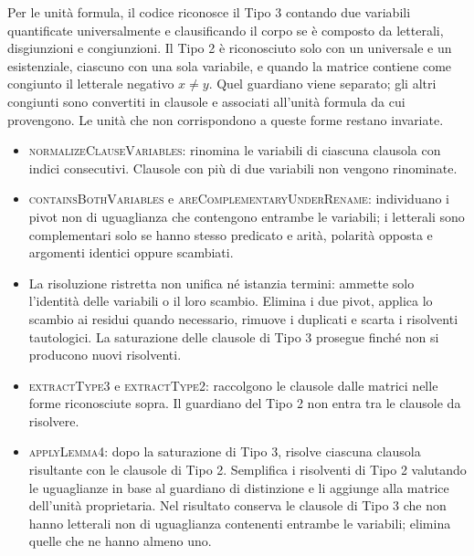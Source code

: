 Per le unità formula, il codice riconosce il Tipo 3 contando due variabili quantificate universalmente e clausificando il corpo se è composto da letterali, disgiunzioni e congiunzioni. Il Tipo 2 è riconosciuto solo con un universale e un esistenziale, ciascuno con una sola variabile, e quando la matrice contiene come congiunto il letterale negativo $x\ne y$. Quel guardiano viene separato; gli altri congiunti sono convertiti in clausole e associati all'unità formula da cui provengono. Le unità che non corrispondono a queste forme restano invariate.
\begin{itemize}
    \item \textsc{normalizeClauseVariables}: rinomina le variabili di ciascuna clausola con indici consecutivi. Clausole con più di due variabili non vengono rinominate.
    
    \item \textsc{containsBothVariables} e \textsc{areComplementaryUnderRename}: individuano i pivot non di uguaglianza che contengono entrambe le variabili; i letterali sono complementari solo se hanno stesso predicato e arità, polarità opposta e argomenti identici oppure scambiati.
    
    \item La risoluzione ristretta non unifica né istanzia termini: ammette solo l'identità delle variabili o il loro scambio. Elimina i due pivot, applica lo scambio ai residui quando necessario, rimuove i duplicati e scarta i risolventi tautologici. La saturazione delle clausole di Tipo 3 prosegue finché non si producono nuovi risolventi.
    
    \item \textsc{extractType3} e \textsc{extractType2}: raccolgono le clausole dalle matrici nelle forme riconosciute sopra. Il guardiano del Tipo 2 non entra tra le clausole da risolvere.
    
    \item \textsc{applyLemma4}: dopo la saturazione di Tipo 3, risolve ciascuna clausola risultante con le clausole di Tipo 2. Semplifica i risolventi di Tipo 2 valutando le uguaglianze in base al guardiano di distinzione e li aggiunge alla matrice dell'unità proprietaria. Nel risultato conserva le clausole di Tipo 3 che non hanno letterali non di uguaglianza contenenti entrambe le variabili; elimina quelle che ne hanno almeno uno.
\end{itemize}




